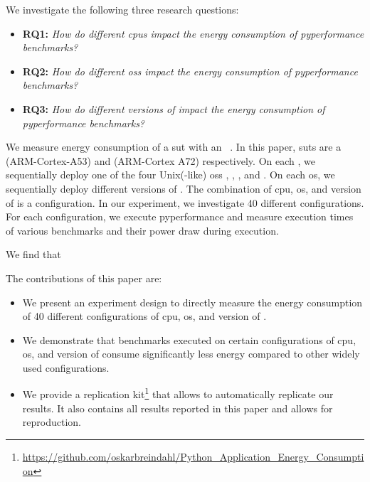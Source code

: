 We investigate the following three research questions:
\begin{itemize}
  \item \textbf{RQ1:} \textit{How do different \glspl{cpu} impact the energy consumption of \gls{pyperformance} benchmarks?}
  \item \textbf{RQ2:} \textit{How do different \glspl{os} impact the energy consumption of \gls{pyperformance} benchmarks?}
  \item \textbf{RQ3:} \textit{How do different versions of \cp impact the energy consumption of \gls{pyperformance} benchmarks?}
\end{itemize}

We measure energy consumption of a \gls{sut} with an ~\cite{qoitech2022otii}.
In this paper, \glspl{sut} are a  (ARM-Cortex-A53) and  (ARM-Cortex A72) respectively.
On each , we sequentially deploy one of the four Unix(-like) \glspl{os} , , , and .
On each \gls{os}, we sequentially deploy different versions of \cp.
The combination of \gls{cpu}, \gls{os}, and version of \cp is a configuration.
In our experiment, we investigate 40 different configurations.
For each configuration, we execute \gls{pyperformance} and measure execution times of various benchmarks and their power draw during execution.

We find that


The contributions of this paper are:
\begin{itemize}
  \item We present an experiment design to directly measure the energy consumption of 40 different configurations of \gls{cpu}, \gls{os}, and version of \cp.
  \item We demonstrate that benchmarks executed on certain configurations of \gls{cpu}, \gls{os}, and version of \cp consume significantly less energy compared to other widely used configurations.
  \item We provide a replication kit\footnote{\url{https://github.com/oskarbreindahl/Python_Application_Energy_Consumption}} that allows to automatically replicate our results. It also contains all results reported in this paper and allows for reproduction.
\end{itemize}
